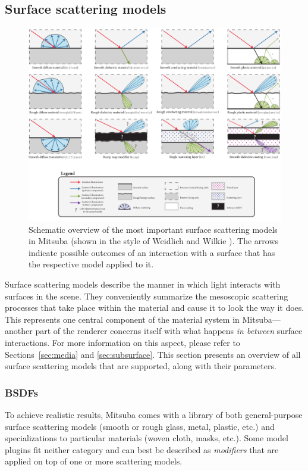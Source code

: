 \newpage
\subsection{Surface scattering models}
\begin{figure}[h!]
\centering
\includegraphics[width=15.5cm]{images/bsdf_overview.pdf}
\caption{
	Schematic overview of the most important surface scattering models in
	Mitsuba (shown in the style of Weidlich and Wilkie \cite{Weidlich2007Arbitrarily}). The arrows indicate possible outcomes of an
	interaction with a surface that has the respective model applied to it.
	\vspace{4mm}
}
\end{figure}

\label{sec:bsdfs}
Surface scattering models describe the manner in which light interacts
with surfaces in the scene. They conveniently summarize the mesoscopic
scattering processes that take place within the material and
cause it to look the way it does.
This represents one central component of the material system in Mitsuba---another
part of the renderer concerns itself with what happens
\emph{in between} surface interactions. For more information on this aspect,
please refer to Sections~\ref{sec:media} and \ref{sec:subsurface}.
This section presents an overview of all surface scattering models that are
supported, along with their parameters.

\subsubsection*{BSDFs}
To achieve realistic results, Mitsuba comes with a library of both
general-purpose surface scattering models (smooth or rough glass, metal,
plastic, etc.) and specializations to particular materials (woven cloth,
masks, etc.). Some model plugins fit neither category and can best be described
as \emph{modifiers} that are applied on top of one or more scattering models.


